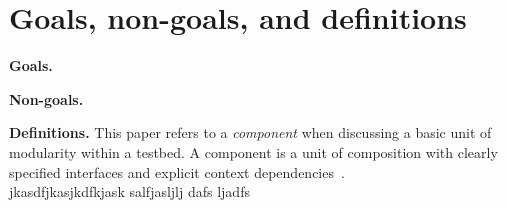 \section{Goals, non-goals, and definitions}\label{sec-prelim}\label{sec-goals}


\textbf{Goals.}

\textbf{Non-goals.}

\textbf{Definitions.} This paper refers to a \textit{component} when discussing a basic 
unit of modularity within a testbed. A component is a unit of composition 
with clearly specified interfaces and  explicit  context  
dependencies~\cite{crnkovic2002building}.  \\

jkasdfjkasjkdfkjask salfjasljlj dafs ljadfs
